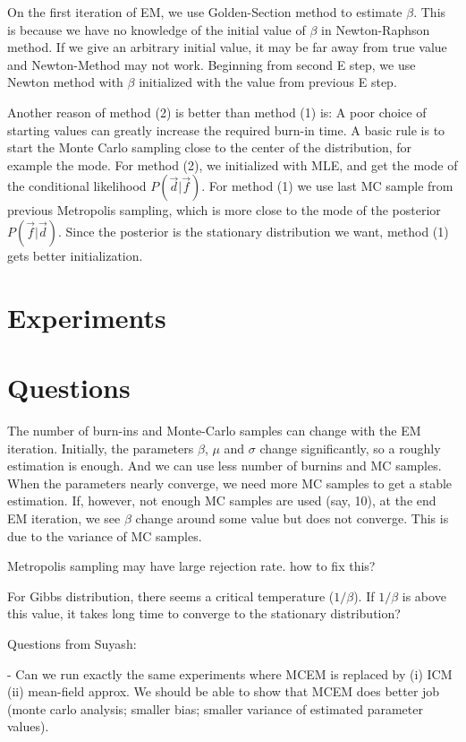 \documentclass[12pt]{article}
\begin{document}
On the first iteration of EM, we use Golden-Section method to estimate $\beta$. This is because we have no knowledge of the initial value of $\beta$ in Newton-Raphson method. If we give an arbitrary initial value, it may be far away from true value and Newton-Method may not work. Beginning from second E step, we use Newton method with $\beta$ initialized with the value from previous E step.

Another reason of method (2) is better than method (1) is: A poor choice of starting values can greatly increase the required burn-in time. A basic rule is to start the Monte Carlo sampling close to the center of the distribution, for example the mode. For method (2), we initialized with MLE, and get the mode of the conditional likelihood $P(\vec d | \vec f)$. For method (1) we use last MC sample from previous Metropolis sampling, which is more close to the mode of the posterior $P(\vec f | \vec d)$. Since the posterior is the stationary distribution we want, method (1) gets better initialization. 



\section{Experiments}

\section{Questions}
The number of burn-ins and Monte-Carlo samples can change with the EM iteration. Initially, the parameters $\beta$, $\mu$ and $\sigma$ change significantly, so a roughly estimation is enough. And we can use less number of burnins and MC samples. When the parameters nearly converge, we need more MC samples to get a stable estimation. If, however, not enough MC samples are used (say, 10), at the end EM iteration, we see $\beta$ change around some value but does not converge. This is due to the variance of MC samples.


Metropolis sampling may have large rejection rate. how to fix this?

For Gibbs distribution, there seems a critical temperature ($1/\beta$). If $1/\beta$ is above this value, it takes long time to converge to the stationary distribution?

Questions from Suyash:

- Can we run exactly the same experiments where MCEM is replaced by (i) ICM (ii) mean-field approx. We should be able to show that MCEM does better job (monte carlo analysis; smaller bias; smaller variance of estimated parameter values).
\end{document}

